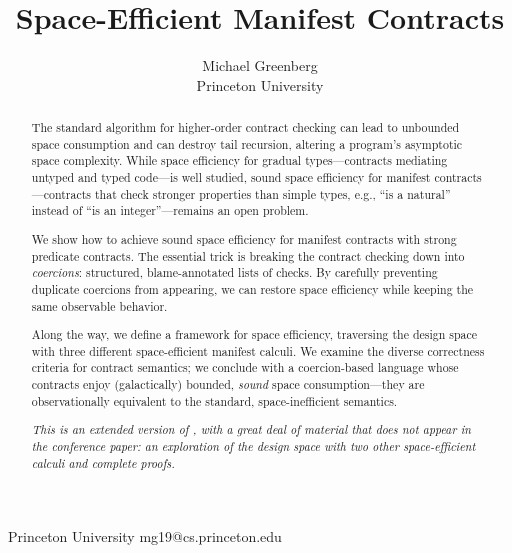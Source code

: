 \documentclass[9pt]{extarticle}
\begin{document}
\numbertheoremsfalse

\ifpopl
{} 
\fi



\iffull\else
\exclusivelicense                 \fi


{\iffull\else
\ifdraft
{}           \fi
\fi}

\title{Space-Efficient Manifest Contracts}


{\iffull
\author{Michael Greenberg \\ Princeton University}
\else
{}
           {Princeton University}
           {mg19@cs.princeton.edu}
\fi}

\maketitle

\begin{abstract}
  The standard algorithm for higher-order contract checking can lead
  to unbounded space consumption and can destroy tail recursion,
  altering a program's asymptotic space complexity.
While space efficiency for gradual types---contracts mediating
  untyped and typed code---is well studied, sound space efficiency for
  manifest contracts---contracts that check stronger properties than
  simple types, e.g., ``is a natural'' instead of ``is an
  integer''---remains an open problem.

  We show how to achieve sound space efficiency for manifest contracts
  with strong predicate contracts. The essential trick is
  breaking the contract checking down into \textit{coercions}:
  structured, blame-annotated lists of checks. By carefully preventing
  duplicate coercions from appearing, we can restore space efficiency
  while keeping the same observable behavior.

  {\iffull Along the way, we define a framework for space efficiency,
    traversing the design space with three different space-efficient
    manifest calculi. We examine the diverse correctness criteria for
    contract semantics; we conclude with a coercion-based language
    whose contracts enjoy (galactically) bounded, \textit{sound} space
    consumption---they are observationally equivalent to the standard,
    space-inefficient semantics.  

    \textit{This is an extended version of \citet{Greenberg15space}, with a
    great deal of material that does not appear in the conference
    paper: an exploration of the design space with two other
    space-efficient calculi and complete proofs.}  \fi}
\end{abstract}
\end{document}
